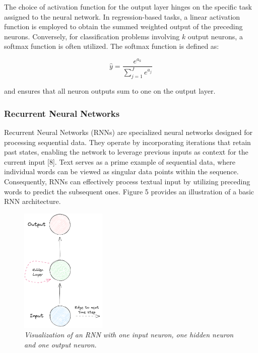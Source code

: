 The choice of activation function for the output layer hinges on the specific task assigned to the neural network. In regression-based tasks, a linear activation function is employed to obtain the summed weighted output of the preceding neurons. Conversely, for classification problems involving \(k\) output neurons, a softmax function is often utilized. The softmax function is defined as:

\begin{equation}
    \hat{y} = \frac{e^{a_k}}{\sum_{j=1}^J e^{a_j}}
\end{equation}

\noindent and ensures that all neuron outputs sum to one on the output layer.

\subsubsection*{Recurrent Neural Networks}

Recurrent Neural Networks (RNNs) are specialized neural networks designed for processing sequential data. They operate by incorporating iterations that retain past states, enabling the network to leverage previous inputs as context for the current input [8]. Text serves as a prime example of sequential data, where individual words can be viewed as singular data points within the sequence. Consequently, RNNs can effectively process textual input by utilizing preceding words to predict the subsequent ones. Figure 5 provides an illustration of a basic RNN architecture.


\begin{figure}[H]
    \centering
    \includegraphics[width=\textwidth,height=6cm,keepaspectratio=true]{rnn.png}
    \caption{
        \it{Visualization of an RNN with one input neuron, one hidden neuron and
            one output neuron.}
    }
    \label{fig:rnn}
\end{figure}

